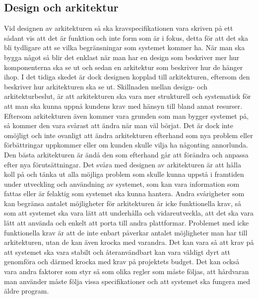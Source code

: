 \subsection{Design och arkitektur}
Vid designen av arkitekturen så ska kravspecifikationen vara skriven på ett sådant vis att det är funktion och inte form som är i fokus, detta för att det ska bli tydligare att se vilka begränsningar som systemet kommer ha. När man ska bygga något så blir det enklast när man har en design som beskriver mer hur komponenterna ska se ut och sedan en arkitektur som beskriver hur de hänger ihop. I det tidiga skedet är dock designen kopplad till arkitekturen, eftersom den beskriver hur arkitekturen ska se ut. \cite[s. 224--225]{set}
\newline
\newline
Skillnaden mellan design- och arkitekturbeslut, är att arkitekturen ska vara mer strukturell och systematisk för att man ska kunna uppnå kundens krav med hänsyn till bland annat resurser. Eftersom arkitekturen även kommer vara grunden som man bygger systemet på, så kommer den vara svårast att ändra när man väl börjat. Det är dock inte omöjligt och inte ovanligt att ändra arkitekturen efterhand som nya problem eller förbättringar uppkommer eller om kunden skulle vilja ha någonting annorlunda. Den bästa arkitekturen är ändå den som efterhand går att förändra och anpassa efter nya förutsättningar. \cite[s. 224--225]{set}
\newline
\newline
Det svåra med designen av arkitekturen är att hålla koll på och tänka ut alla möjliga problem som skulle kunna uppstå i framtiden under utveckling och användning av systemet, som kan vara information som fattas eller är felaktig som systemet ska kunna hantera. Andra svårigheter som kan begränsa antalet möjligheter för arkitekturen är icke funktionella krav, så som att systemet ska vara lätt att underhålla och vidareutveckla, att det ska vara lätt att använda och enkelt att porta till andra plattformar. Problemet med icke funktionella krav är att de inte enbart påverkar antalet möjligheter man har till arkitekturen, utan de kan även krocka med varandra. Det kan vara så att krav på att systemet ska vara stabilt och återanvändbart kan vara väldigt dyrt att genomföra och därmed krocka med krav på projektets budget. Det kan också vara andra faktorer som styr så som olika regler som måste följas, att hårdvaran man använder måste följa vissa specifikationer och att systemet ska fungera med äldre program. \cite[s. 224--225]{set}

